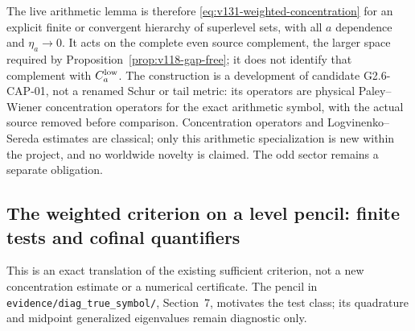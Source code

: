 \documentclass[11pt]{article}
\theoremstyle{remark}
\begin{document}
The live arithmetic lemma is therefore
\eqref{eq:v131-weighted-concentration} for an explicit finite or
convergent hierarchy of superlevel sets, with all $a$ dependence and
$\eta_a\to0$.  It acts on the complete even source complement, the
larger space required by Proposition~\ref{prop:v118-gap-free}; it does
not identify that complement with $C_a^{\rm low}$.  The construction
is a development of candidate G2.6-CAP-01, not a renamed Schur or tail
metric: its operators are physical Paley--Wiener concentration
operators for the exact arithmetic symbol, with the actual source
removed before comparison.  Concentration operators and
Logvinenko--Sereda estimates are classical; only this arithmetic
specialization is new within the project, and no worldwide novelty is
claimed.  The odd sector remains a separate obligation.

\subsection{The weighted criterion on a level pencil: finite tests and cofinal quantifiers}

This is an exact translation of the existing sufficient criterion, not a
new concentration estimate or a numerical certificate. The pencil in
\texttt{evidence/diag\_true\_symbol/}, Section~7, motivates the test class;
its quadrature and midpoint generalized eigenvalues remain diagnostic only.
\end{document}
